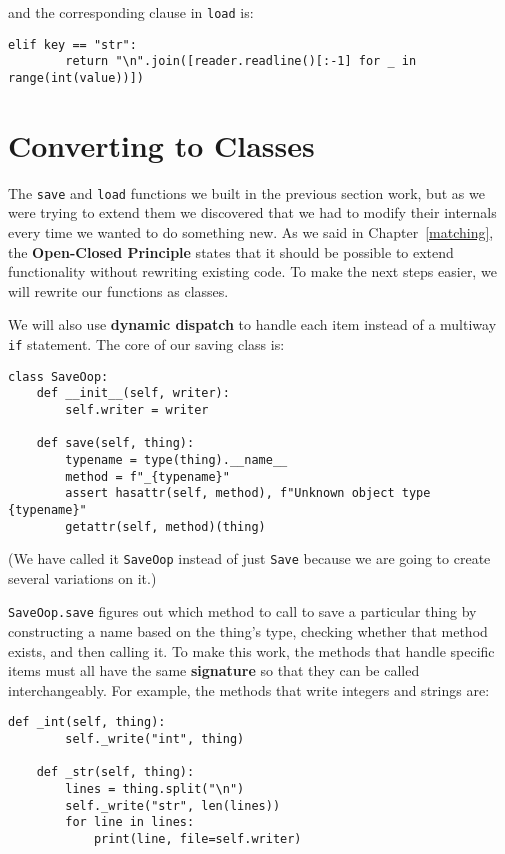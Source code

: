 \documentclass{scrbook}
\newcommand{\chapref}[1]{Chapter~\ref{#1}}
\newcommand{\glossref}[1]{\textbf{#1}}
\begin{document}
\noindent and the corresponding clause in \texttt{load} is:


\begin{lstlisting}[frame=single,frameround=tttt]
    elif key == "str":
        return "\n".join([reader.readline()[:-1] for _ in range(int(value))])
\end{lstlisting}


\section{Converting to Classes}\label{persistance-oop}


The \texttt{save} and \texttt{load} functions we built in the previous section work,
but as we were trying to extend them
we discovered that we had to modify their internals
every time we wanted to do something new.
As we said in \chapref{matching},
the \glossref{Open-Closed Principle}
states that it should be possible to extend functionality
without rewriting existing code.
To make the next steps easier,
we will rewrite our functions as classes.


We will also use \glossref{dynamic dispatch}
to handle each item
instead of a multiway \texttt{if} statement.
The core of our saving class is:


\begin{lstlisting}[frame=single,frameround=tttt]
class SaveOop:
    def __init__(self, writer):
        self.writer = writer

    def save(self, thing):
        typename = type(thing).__name__
        method = f"_{typename}"
        assert hasattr(self, method), f"Unknown object type {typename}"
        getattr(self, method)(thing)
\end{lstlisting}



\noindent (We have called it \texttt{SaveOop} instead of just \texttt{Save}
because we are going to create several variations on it.)


\texttt{SaveOop.save} figures out which method to call to save a particular thing
by constructing a name based on the thing's type,
checking whether that method exists,
and then calling it.
To make this work,
the methods that handle specific items
must all have the same \glossref{signature}
so that they can be called interchangeably.
For example,
the methods that write integers and strings are:


\begin{lstlisting}[frame=single,frameround=tttt]
    def _int(self, thing):
        self._write("int", thing)

    def _str(self, thing):
        lines = thing.split("\n")
        self._write("str", len(lines))
        for line in lines:
            print(line, file=self.writer)
\end{lstlisting}
\end{document}
